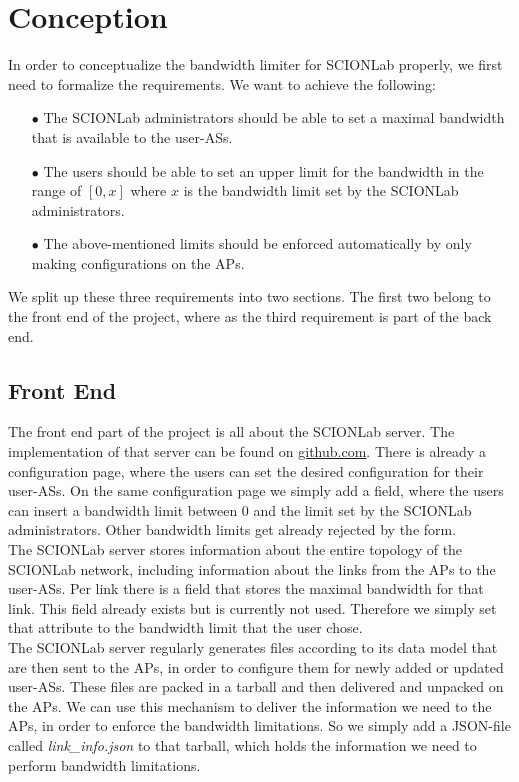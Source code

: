 \chapter{Conception}
In order to conceptualize the bandwidth limiter for \acs{SCIONLab} properly, we first need to formalize the requirements. We want to achieve the following:

\begin{enumerate}
\item[$\bullet$]The \acs{SCIONLab} administrators should be able to set a maximal bandwidth that is available to the user-\acsp{AS}.
\item[$\bullet$]The users should be able to set an upper limit for the bandwidth in the range of $[0,x]$ where $x$ is the bandwidth limit set by the \acs{SCIONLab} administrators.
\item[$\bullet$] The above-mentioned limits should be enforced automatically by only making configurations on the \acsp{AP}.
\end{enumerate}

We split up these three requirements into two sections. The first two belong to the front end of the project, where as the third requirement is part of the back end.

\section{Front End}

The front end part of the project is all about the \acs{SCIONLab} server. The implementation of that server can be found on \href{https://github.com/ManuelMeinen/scionlab/tree/bw-limit}{github.com}\cite{meinen2019scionlab}. There is already a configuration page, where the users can set the desired configuration for their user-\acsp{AS}. On the same configuration page we simply add a field, where the users can insert a bandwidth limit between 0 and the limit set by the \acs{SCIONLab} administrators. Other bandwidth limits get already rejected by the form.
\\
The \acs{SCIONLab} server stores information about the entire topology of the \acs{SCIONLab} network, including information about the links from the \acsp{AP} to the user-\acsp{AS}. Per link there is a field that stores the maximal bandwidth for that link. This field already exists but is currently not used. Therefore we simply set that attribute to the bandwidth limit that the user chose.
\\
The \acs{SCIONLab} server regularly generates files according to its data model that are then sent to the \acsp{AP}, in order to configure them for newly added or updated user-\acsp{AS}. These files are packed in a tarball and then delivered and unpacked on the \acsp{AP}. We can use this mechanism to deliver the information we need to the \acsp{AP}, in order to enforce the bandwidth limitations. So we simply add a \ac{JSON}-file called \textit{link\_info.json} to that tarball, which holds the information we need to perform bandwidth limitations.

